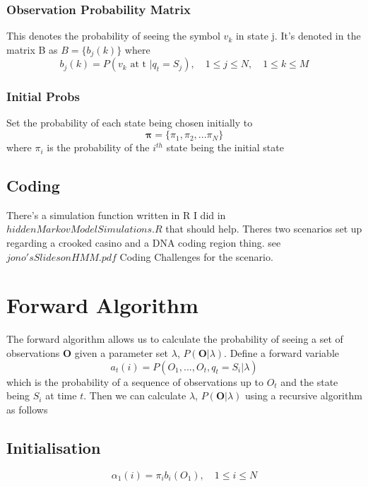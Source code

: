 \documentclass[]{article}
\begin{document}
			\subsubsection{Observation Probability Matrix}
				This denotes the probability of seeing the symbol $v_k$ in state j. It's denoted in the matrix B as $B=\lbrace b_j(k)\rbrace$ where
				\begin{equation}
					b_j(k)=P\left( v_k\text{ at t }| q_t=S_j \right),\quad 1 \le j \le N,\quad 1 \le k \le M
				\end{equation}
			\subsubsection{Initial Probs}
				Set the probability of each state being chosen initially to
				\begin{equation}
					\mathbf{\pi}=\lbrace \pi_1,\pi_2,...\pi_N \rbrace
				\end{equation}
				where $\pi_i$ is the probability of the $i^{th}$ state being the initial state
		\subsection{Coding}
			There's a simulation function written in R I did in $hiddenMarkovModelSimulations.R$ that should help. Theres two scenarios set up regarding a crooked casino and a DNA coding region thing. see $jono's Slides on HMM.pdf$ Coding Challenges for the scenario. 
	\section{Forward Algorithm}
		The forward algorithm allows us to calculate the probability of seeing a set of observations $\mathbf{O}$ given a parameter set $\lambda$, $P(\mathbf{O} | \lambda)$. Define a forward variable
		\begin{equation}
			a_t(i)=P(O_1,...,O_t,q_t=S_i|\lambda)
		\end{equation}
		which is the probability of a sequence of observations up to $O_t$ and the state being $S_i$ at time $t$. Then we can calculate $\lambda$, $P(\mathbf{O} | \lambda)$ using a recursive algorithm as follows
		\subsection{Initialisation}
			\begin{equation}
				\alpha_1(i)=\pi_i b_i(O_1), \quad 1 \le i \le N
			\end{equation}
			
\end{document}
